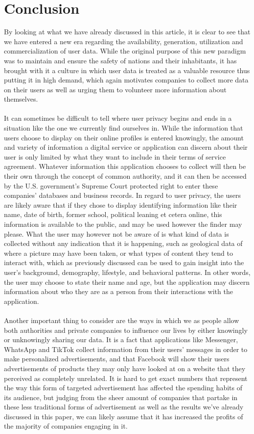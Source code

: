 \documentclass[11pt]{article}
\begin{document}
\section{Conclusion}
By looking at what we have already discussed in this article, it is clear to see that we have entered a new era regarding the availability, generation, utilization and commercialization of user data. While the original purpose of this new paradigm was to maintain and ensure the safety of nations and their inhabitants, it has brought with it a culture in which user data is treated as a valuable resource thus putting it in high demand, which again motivates companies to collect more data on their users as well as urging them to volunteer more information about themselves.
\\ \\
It can sometimes be difficult to tell where user privacy begins and ends in a situation like the one we currently find ourselves in. While the information that users choose to display on their online profiles is entered knowingly, the amount and variety of information a digital service or application can discern about their user is only limited by what they want to include in their terms of service agreement. Whatever information this application chooses to collect will then be their own through the concept of common authority, and it can then be accessed by the U.S. government’s Supreme Court protected right to enter these companies’ databases and business records. In regard to user privacy, the users are likely aware that if they chose to display identifying information like their name, date of birth, former school, political leaning et cetera online, this information is available to the public, and may be used however the finder may please. What the user may however not be aware of is what kind of data is collected without any indication that it is happening, such as geological data of where a picture may have been taken, or what types of content they tend to interact with, which as previously discussed can be used to gain insight into the user’s background, demography, lifestyle, and behavioral patterns. In other words, the user may choose to state their name and age, but the application may discern information about who they are as a person from their interactions with the application.
\\ \\
Another important thing to consider are the ways in which we as people allow both authorities and private companies to influence our lives by either knowingly or unknowingly sharing our data. It is a fact that applications like Messenger, WhatsApp and TikTok collect information from their users’ messages in order to make personalized advertisements, and that Facebook will show their users advertisements of products they may only have looked at on a website that they perceived as completely unrelated. It is hard to get exact numbers that represent the way this form of targeted advertisement has affected the spending habits of its audience, but judging from the sheer amount of companies that partake in these less traditional forms of advertisement as well as the results we’ve already discussed in this paper, we can likely assume that it has increased the profits of the majority of companies engaging in it.
\end{document}
